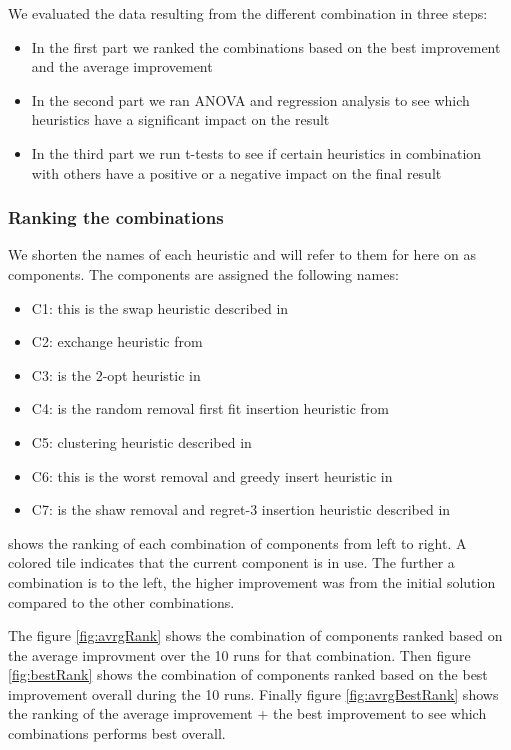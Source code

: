 \documentclass[../main.tex]{subfiles}
\begin{document}
\par We evaluated the data resulting from the different combination in three steps:
\begin{itemize}
    \item In the first part we ranked the combinations based on the best improvement and the average improvement
    \item In the second part we ran ANOVA and regression analysis to see which heuristics have a significant impact on the result
    \item In the third part we run t-tests to see if certain heuristics in combination with others have a positive or a negative impact on the final result
\end{itemize}

\subsubsection{Ranking the combinations}
We shorten the names of each heuristic and will refer to them for here on as components. The components are assigned the following names:
\begin{itemize}
    \item C1: this is the swap heuristic described in 
    \item C2: exchange heuristic from 
    \item C3: is the 2-opt heuristic in  
    \item C4: is the random removal first fit insertion heuristic from 
    \item C5: clustering heuristic described in 
    \item C6: this is the worst removal and greedy insert heuristic in 
    \item C7: is the shaw removal and regret-3 insertion heuristic described in 
\end{itemize}

 shows the ranking of each combination of components from left to right.
A colored tile indicates that the current component is in use.
The further a combination is to the left, the higher improvement was from the initial solution compared to the other combinations. \par
The figure \ref{fig:avrgRank} shows the combination of components ranked based on the average improvment over the 10 runs for that combination.
Then figure \ref{fig:bestRank} shows the combination of components ranked based on the best improvement overall during the 10 runs.
Finally figure \ref{fig:avrgBestRank} shows the ranking of the average improvement + the best improvement to see which combinations performs best overall.
\end{document}
